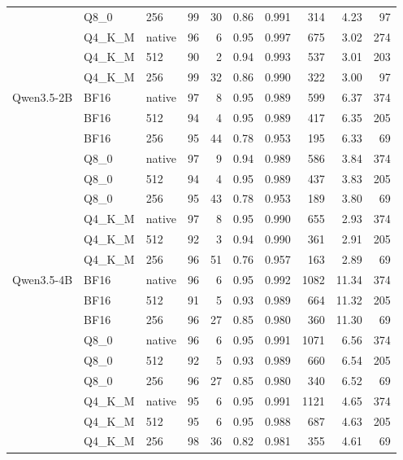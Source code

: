 \begin{tabular}{lllrrrrrrr}
 & Q8\_0 & 256 & 99 & 30 & 0.86 & 0.991 & 314 & 4.23 & 97 \\
 & Q4\_K\_M & native & 96 & 6 & 0.95 & 0.997 & 675 & 3.02 & 274 \\
 & Q4\_K\_M & 512 & 90 & 2 & 0.94 & 0.993 & 537 & 3.01 & 203 \\
 & Q4\_K\_M & 256 & 99 & 32 & 0.86 & 0.990 & 322 & 3.00 & 97 \\
\midrule
Qwen3.5-2B & BF16 & native & 97 & 8 & 0.95 & 0.989 & 599 & 6.37 & 374 \\
 & BF16 & 512 & 94 & 4 & 0.95 & 0.989 & 417 & 6.35 & 205 \\
 & BF16 & 256 & 95 & 44 & 0.78 & 0.953 & 195 & 6.33 & 69 \\
 & Q8\_0 & native & 97 & 9 & 0.94 & 0.989 & 586 & 3.84 & 374 \\
 & Q8\_0 & 512 & 94 & 4 & 0.95 & 0.989 & 437 & 3.83 & 205 \\
 & Q8\_0 & 256 & 95 & 43 & 0.78 & 0.953 & 189 & 3.80 & 69 \\
 & Q4\_K\_M & native & 97 & 8 & 0.95 & 0.990 & 655 & 2.93 & 374 \\
 & Q4\_K\_M & 512 & 92 & 3 & 0.94 & 0.990 & 361 & 2.91 & 205 \\
 & Q4\_K\_M & 256 & 96 & 51 & 0.76 & 0.957 & 163 & 2.89 & 69 \\
\midrule
Qwen3.5-4B & BF16 & native & 96 & 6 & 0.95 & 0.992 & 1082 & 11.34 & 374 \\
 & BF16 & 512 & 91 & 5 & 0.93 & 0.989 & 664 & 11.32 & 205 \\
 & BF16 & 256 & 96 & 27 & 0.85 & 0.980 & 360 & 11.30 & 69 \\
 & Q8\_0 & native & 96 & 6 & 0.95 & 0.991 & 1071 & 6.56 & 374 \\
 & Q8\_0 & 512 & 92 & 5 & 0.93 & 0.989 & 660 & 6.54 & 205 \\
 & Q8\_0 & 256 & 96 & 27 & 0.85 & 0.980 & 340 & 6.52 & 69 \\
 & Q4\_K\_M & native & 95 & 6 & 0.95 & 0.991 & 1121 & 4.65 & 374 \\
 & Q4\_K\_M & 512 & 95 & 6 & 0.95 & 0.988 & 687 & 4.63 & 205 \\
 & Q4\_K\_M & 256 & 98 & 36 & 0.82 & 0.981 & 355 & 4.61 & 69 \\
\bottomrule
\end{tabular}
